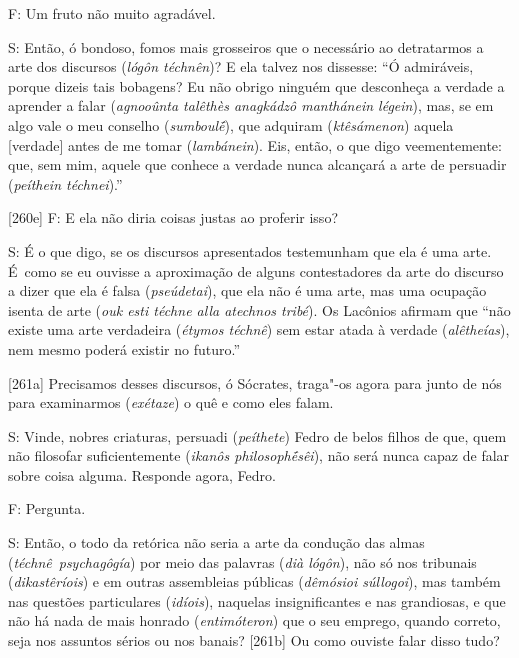 F: Um fruto não muito agradável.

 

S: Então, ó bondoso, fomos mais grosseiros que o necessário ao
detratarmos a arte dos discursos (\emph{lógôn téchnên})? E ela talvez
nos dissesse: ``Ó admiráveis, porque dizeis tais bobagens? Eu não obrigo
ninguém que desconheça a verdade a aprender a falar (\emph{agnooûnta
talêthès anagkádzô manthánein légein}), mas, se em algo vale o meu
conselho (\emph{sumboulḗ}), que adquiram (\emph{ktêsámenon}) aquela
[verdade] antes de me tomar (\emph{lambánein}). Eis, então, o que digo
veementemente: que, sem mim, aquele que conhece a verdade nunca
alcançará a arte de persuadir (\emph{peíthein téchnei}).''

 

[260e] F: E ela não diria coisas justas ao proferir isso?

 

S: É o que digo, se os discursos apresentados testemunham que ela é uma
arte. É~como se eu ouvisse a aproximação de alguns contestadores da arte
do discurso a dizer que ela é falsa (\emph{pseúdetai}), que ela não é
uma arte, mas uma ocupação isenta de arte (\emph{ouk esti téchne alla
atechnos tribé}). Os Lacônios afirmam que ``não existe uma arte
verdadeira (\emph{étymos téchnê}) sem estar atada à verdade
(\emph{alêtheías}), nem mesmo poderá existir no futuro.''

 

 

[261a] Precisamos desses discursos, ó Sócrates, traga"-os agora para
junto de nós para examinarmos (\emph{exétaze}) o quê e como eles falam.

 

S: Vinde, nobres criaturas, persuadi (\emph{peíthete}) Fedro de belos
filhos de que, quem não filosofar suficientemente (\emph{ikanôs
philosophḗsêi}), não será nunca capaz de falar sobre coisa alguma.
Responde agora, Fedro.

 

F: Pergunta.

 

S: Então, o todo da retórica não seria a arte da condução das almas
(\emph{téchnê}~\emph{psychagôgía}) por meio das palavras (\emph{dià
lógôn}), não só nos tribunais (\emph{dikastêríois}) e em outras
assembleias públicas (\emph{dêmósioi súllogoi}), mas também nas questões
particulares (\emph{idíois}), naquelas insignificantes e nas grandiosas,
e que não há nada de mais honrado (\emph{entimóteron}) que o seu
emprego, quando correto, seja nos assuntos sérios ou nos banais?
[261b] Ou como ouviste falar disso tudo?

